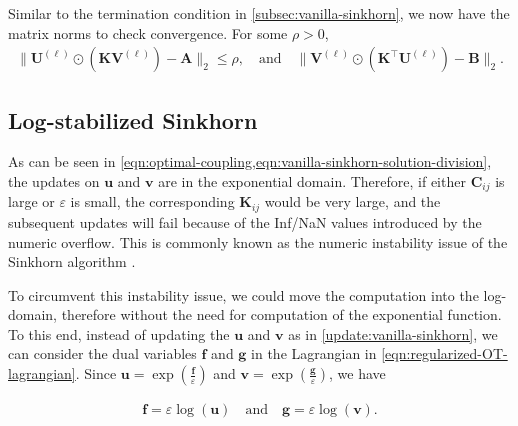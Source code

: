 \begin{remark}
  Similar to the termination condition in \cref{subsec:vanilla-sinkhorn}, we now have the matrix norms to check convergence.
  For some $\rho > 0$,
  \begin{equation*}
    \begin{aligned}
      \lVert
      \mathbf{U}^{(\ell)} \odot \left(\mathbf{K} \mathbf{V}^{(\ell)}\right) - \mathbf{A}
      \rVert_2 \le \rho,
      \quad\text{and}\quad
      \lVert
      \mathbf{V}^{(\ell)} \odot \left(\mathbf{K}^\top \mathbf{U}^{(\ell)}\right) - \mathbf{B}
      \rVert_2.
    \end{aligned}
  \end{equation*}
\end{remark}


\subsection{Log-stabilized Sinkhorn}\label{subsec:log-sinkhorn}

As can be seen in \cref{eqn:optimal-coupling,eqn:vanilla-sinkhorn-solution-division},
the updates on $\mathbf{u}$ and $\mathbf{v}$ are in the exponential domain.
Therefore, if either $\mathbf{C}_{ij}$ is large or $\varepsilon$ is small,
the corresponding $\mathbf{K}_{ij}$ would be very large,
and the subsequent updates will fail because of the Inf/NaN values introduced by the numeric overflow.
This is commonly known as the numeric instability issue of the Sinkhorn algorithm \citep[Chapter 4.4]{peyre2019}.

To circumvent this instability issue, we could move the computation into the log-domain,
therefore without the need for computation of the exponential function.
To this end, instead of updating the $\mathbf{u}$ and $\mathbf{v}$ as in \cref{update:vanilla-sinkhorn},
we can consider the dual variables $\mathbf{f}$ and $\mathbf{g}$ in the Lagrangian in \cref{eqn:regularized-OT-lagrangian}.
Since $\mathbf{u} = \exp \left(\frac{\mathbf{f}}{\varepsilon}\right)$
and $\mathbf{v} = \exp \left(\frac{\mathbf{g}}\varepsilon\right)$, we have

\begin{equation}
  \begin{aligned}
    \mathbf{f} = \varepsilon \log(\mathbf{u})
    \quad\text{and}\quad
    \mathbf{g} = \varepsilon \log(\mathbf{v}).
  \end{aligned}
\end{equation}

